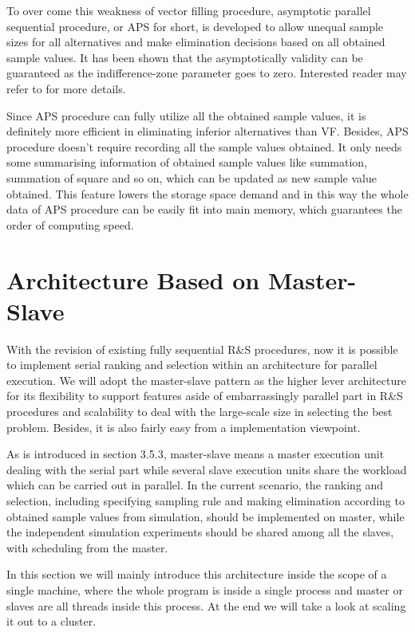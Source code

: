 \documentclass[12pt,a4]{report}
\begin{document}
To over come this weakness of vector filling procedure, asymptotic parallel sequential procedure, or APS for short, is developed to allow unequal sample sizes for all alternatives and make elimination decisions based on all obtained sample values. It has been shown that the asymptotically validity can be guaranteed as the indifference-zone parameter goes to zero. Interested reader may refer to \cite{ras-seq-parallel} for more details.

Since APS procedure can fully utilize all the obtained sample values, it is definitely more efficient in eliminating inferior alternatives than VF. Besides, APS procedure doesn't require recording all the sample values obtained. It only needs some summarising information of obtained sample values like summation, summation of square and so on, which can be updated as new sample value obtained. This feature lowers the storage space demand and in this way the whole data of APS procedure can be easily fit into main memory, which guarantees the order of computing speed.

\section{Architecture Based on Master-Slave}

With the revision of existing fully sequential R\&S procedures, now it is possible to implement serial ranking and selection within an architecture for parallel execution. We will adopt the master-slave pattern as the higher lever architecture for its flexibility to support features aside of embarrassingly parallel part in R\&S procedures and scalability to deal with the large-scale size in selecting the best problem. Besides, it is also fairly easy from a implementation viewpoint.

As is introduced in section 3.5.3, master-slave means a master execution unit dealing with the serial part while several slave execution units share the workload which can be carried out in parallel. In the current scenario, the ranking and selection, including specifying sampling rule and making elimination according to obtained sample values from simulation, should be implemented on master, while the independent simulation experiments should be shared among all the slaves, with scheduling from the master.

In this section we will mainly introduce this architecture inside the scope of a single machine, where the whole program is inside a single process and master or slaves are all threads inside this process. At the end we will take a look at scaling it out to a cluster.
\end{document}
